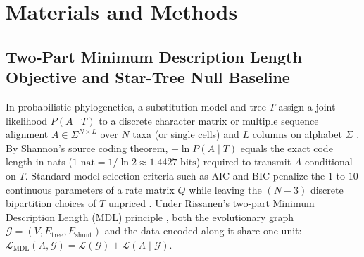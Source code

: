 \documentclass[12pt]{article}
\begin{document}
\section*{Materials and Methods}

\subsection*{Two-Part Minimum Description Length Objective and Star-Tree Null Baseline}

In probabilistic phylogenetics, a substitution model and tree $T$ assign a joint likelihood $P(A \mid T)$ to a discrete character matrix or multiple sequence alignment $A \in \Sigma^{N \times L}$ over $N$ taxa (or single cells) and $L$ columns on alphabet $\Sigma$ \cite{felsenstein1981evolutionary}. By Shannon's source coding theorem, $-\ln P(A \mid T)$ equals the exact code length in nats ($1\text{ nat} = 1/\ln 2 \approx 1.4427\text{ bits}$) required to transmit $A$ conditional on $T$. Standard model-selection criteria such as AIC and BIC \cite{akaike1974new,schwarz1978estimating,posada2004model,kalyaanamoorthy2017modelfinder} penalize the $1$ to $10$ continuous parameters of a rate matrix $Q$ while leaving the $(N-3)$ discrete bipartition choices of $T$ unpriced \cite{box1976science,susko2020use}. Under Rissanen's two-part Minimum Description Length (MDL) principle \cite{rissanen1978modeling,rissanen1983universal}, both the evolutionary graph $\mathcal{G} = (V, E_{\text{tree}}, E_{\text{shunt}})$ and the data encoded along it share one unit: $\mathcal{L}_{\text{MDL}}(A, \mathcal{G}) = \mathcal{L}(\mathcal{G}) + \mathcal{L}(A \mid \mathcal{G})$.
\end{document}

